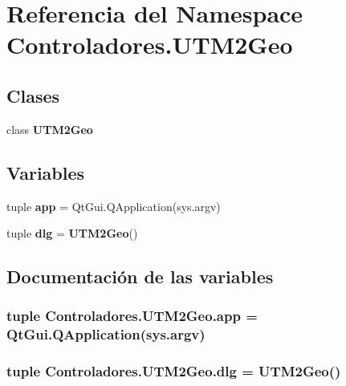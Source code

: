 \section{Referencia del Namespace Controladores.\-U\-T\-M2\-Geo}
\label{namespaceControladores_1_1UTM2Geo}
\subsection*{Clases}
\begin{DoxyCompactItemize}
\item 
class {\bf U\-T\-M2\-Geo}
\end{DoxyCompactItemize}
\subsection*{Variables}
\begin{DoxyCompactItemize}
\item 
tuple {\bf app} = Qt\-Gui.\-Q\-Application(sys.\-argv)
\item 
tuple {\bf dlg} = {\bf U\-T\-M2\-Geo}()
\end{DoxyCompactItemize}


\subsection{Documentación de las variables}
\subsubsection[{app}]{\setlength{\rightskip}{0pt plus 5cm}tuple Controladores.\-U\-T\-M2\-Geo.\-app = Qt\-Gui.\-Q\-Application(sys.\-argv)}\label{namespaceControladores_1_1UTM2Geo_a5440491bef24f8028223bc8086cbafc0}
\subsubsection[{dlg}]{\setlength{\rightskip}{0pt plus 5cm}tuple Controladores.\-U\-T\-M2\-Geo.\-dlg = {\bf U\-T\-M2\-Geo}()}\label{namespaceControladores_1_1UTM2Geo_a081dc97189f93d84a23fe525b510b1dd}
